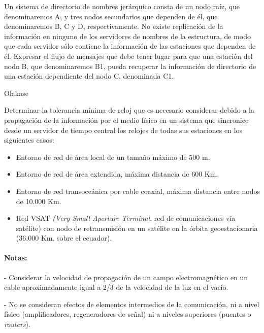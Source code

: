   \begin{problem}[10]
  Un sistema de directorio de nombres jerárquico consta de un nodo raíz, que
denominaremos A, y tres nodos secundarios que dependen de él, que denominaremos
B, C y D, respectivamente. No existe replicación de la información en ninguno
de los servidores de nombres de la estructura, de modo que cada servidor sólo
contiene la información de las estaciones que dependen de él. Expresar el flujo
de mensajes que debe tener lugar para que una estación del nodo B, que
denominaremos B1, pueda recuperar la información de directorio de una estación
dependiente del nodo C, denominada C1.
  \solution

  Olakase

  \end{problem}

  \begin{problem}[11]
  Determinar la tolerancia mínima de reloj que es necesario considerar
  debido a la propagación de la información por el medio físico en un sistema
  que sincronice desde un servidor de tiempo central los relojes de todas
  sus estaciones en los siguientes casos:
  \begin{itemize}
    \item Entorno de red de área local de un tamaño máximo de 500 m.
    \item Entorno de red de área extendida, máxima distancia de 600 Km.
    \item Entorno de red transoceánica por cable coaxial, máxima distancia entre
nodos de 10.000 Km.
    \item Red VSAT \textit{(Very Small Aperture Terminal}, red de comunicaciones vía
satélite) con nodo de retransmisión en un satélite en la órbita geoestacionaria
(36.000 Km. sobre el ecuador).
  \end{itemize}
  \paragraph{Notas: }
  - Considerar la velocidad de propagación de un campo electromagnético 
en un cable aproximadamente igual a 2/3 de la velocidad de la luz en el 
vacío.

  - No se consideran efectos de elementos intermedios de la comunicación,
  ni a nivel físico (amplificadores,  regeneradores de señal) ni a niveles
  superiores (puentes o \textit{routers}).
  
  \solution

  \end{problem}

